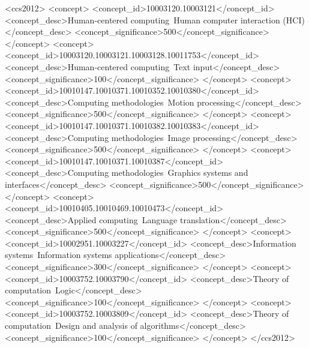 \documentclass{sig-alternate-05-2015}
\begin{document}
%
%
\begin{CCSXML}
	<ccs2012>
	<concept>
	<concept_id>10003120.10003121</concept_id>
	<concept_desc>Human-centered computing~Human computer interaction (HCI)</concept_desc>
	<concept_significance>500</concept_significance>
	</concept>
	<concept>
	<concept_id>10003120.10003121.10003128.10011753</concept_id>
	<concept_desc>Human-centered computing~Text input</concept_desc>
	<concept_significance>100</concept_significance>
	</concept>
	<concept>
	<concept_id>10010147.10010371.10010352.10010380</concept_id>
	<concept_desc>Computing methodologies~Motion processing</concept_desc>
	<concept_significance>500</concept_significance>
	</concept>
	<concept>
	<concept_id>10010147.10010371.10010382.10010383</concept_id>
	<concept_desc>Computing methodologies~Image processing</concept_desc>
	<concept_significance>500</concept_significance>
	</concept>
	<concept>
	<concept_id>10010147.10010371.10010387</concept_id>
	<concept_desc>Computing methodologies~Graphics systems and interfaces</concept_desc>
	<concept_significance>500</concept_significance>
	</concept>
	<concept>
	<concept_id>10010405.10010469.10010473</concept_id>
	<concept_desc>Applied computing~Language translation</concept_desc>
	<concept_significance>500</concept_significance>
	</concept>
	<concept>
	<concept_id>10002951.10003227</concept_id>
	<concept_desc>Information systems~Information systems applications</concept_desc>
	<concept_significance>300</concept_significance>
	</concept>
	<concept>
	<concept_id>10003752.10003790</concept_id>
	<concept_desc>Theory of computation~Logic</concept_desc>
	<concept_significance>100</concept_significance>
	</concept>
	<concept>
	<concept_id>10003752.10003809</concept_id>
	<concept_desc>Theory of computation~Design and analysis of algorithms</concept_desc>
	<concept_significance>100</concept_significance>
	</concept>
	</ccs2012>
\end{CCSXML}

\end{document}
